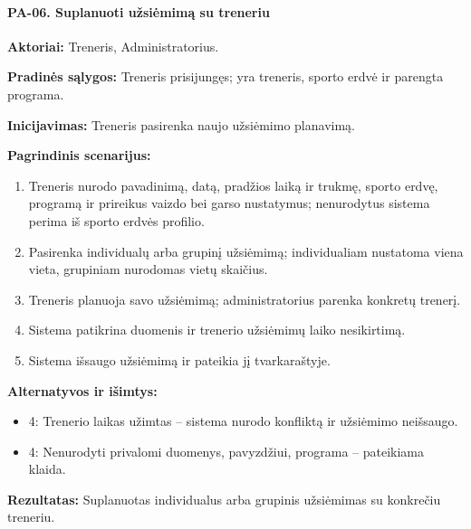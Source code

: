 \paragraph{PA-06. Suplanuoti užsiėmimą su treneriu}\mbox{}\par
\textbf{Aktoriai:} Treneris, Administratorius.\par
\textbf{Pradinės sąlygos:} Treneris prisijungęs; yra treneris, sporto erdvė ir parengta programa.\par
\textbf{Inicijavimas:} Treneris pasirenka naujo užsiėmimo planavimą.\par
\textbf{Pagrindinis scenarijus:}
\begin{enumerate}
\item Treneris nurodo pavadinimą, datą, pradžios laiką ir trukmę, sporto erdvę, programą ir prireikus vaizdo bei garso nustatymus; nenurodytus sistema perima iš sporto erdvės profilio.
\item Pasirenka individualų arba grupinį užsiėmimą; individualiam nustatoma viena vieta, grupiniam nurodomas vietų skaičius.
\item Treneris planuoja savo užsiėmimą; administratorius parenka konkretų trenerį.
\item Sistema patikrina duomenis ir trenerio užsiėmimų laiko nesikirtimą.
\item Sistema išsaugo užsiėmimą ir pateikia jį tvarkaraštyje.
\end{enumerate}
\textbf{Alternatyvos ir išimtys:}
\begin{itemize}
\item 4: Trenerio laikas užimtas -- sistema nurodo konfliktą ir užsiėmimo neišsaugo.
\item 4: Nenurodyti privalomi duomenys, pavyzdžiui, programa -- pateikiama klaida.
\end{itemize}
\textbf{Rezultatas:} Suplanuotas individualus arba grupinis užsiėmimas su konkrečiu treneriu.\par
{}
